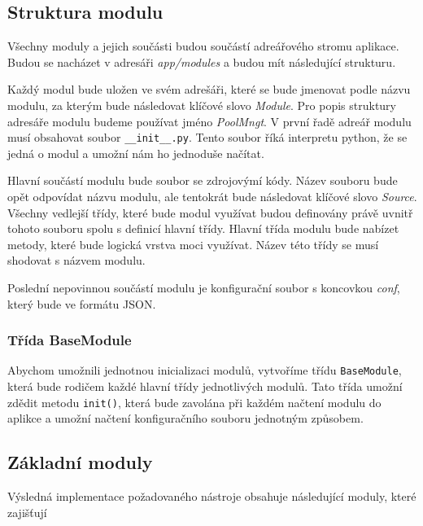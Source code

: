     \subsection{Struktura modulu}
    \label{package}
    Všechny moduly a jejich součásti budou součástí adreářového stromu aplikace. Budou se nacházet v adresáři \emph{app/modules} a budou mít následující strukturu.


    Každý modul bude uložen ve svém adrešáři, které se bude jmenovat podle názvu modulu, za kterým bude následovat klíčové slovo \emph{Module}. Pro popis struktury adresáře modulu budeme používat jméno \emph{PoolMngt}. V první řadě adreář modulu musí obsahovat soubor \verb|__init__.py|. Tento soubor říká interpretu python, že se jedná o modul a umožní nám ho jednoduše načítat. 
    
    Hlavní součástí modulu bude soubor se zdrojovýmí kódy. Název souboru bude opět odpovídat názvu modulu, ale tentokrát bude následovat klíčové slovo \emph{Source}.
    Všechny vedlejší třídy, které bude modul využívat budou definovány právě uvnitř tohoto souboru spolu s definicí hlavní třídy. Hlavní třída modulu bude nabízet metody, které bude logická vrstva moci využívat. Název této třídy se musí shodovat s názvem modulu.
    
    Poslední nepovinnou součástí modulu je konfigurační soubor s koncovkou \emph{conf}, který bude ve formátu JSON.
    
    \subsubsection{Třída BaseModule}
    Abychom umožnili jednotnou inicializaci modulů, vytvoříme třídu \verb|BaseModule|, která bude rodičem každé hlavní třídy jednotlivých modulů. Tato třída umožní zdědit metodu \verb|init()|, která bude zavolána při každém načtení modulu do aplikce a umožní načtení konfiguračního souboru jednotným způsobem.
    
    \subsection{Základní moduly}
    Výsledná implementace požadovaného nástroje obsahuje následující moduly, které zajišťují 

